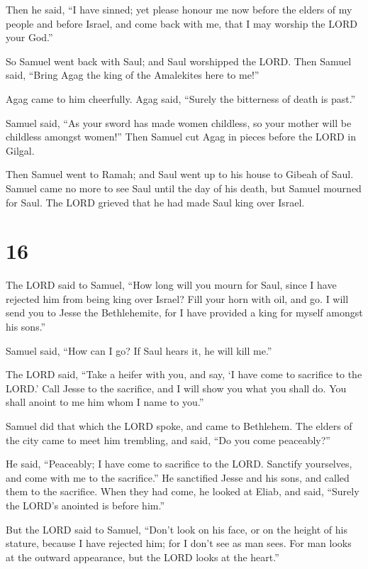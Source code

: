  Then he said, ``I have sinned; yet please honour me now
before the elders of my people and before Israel, and come back with me,
that I may worship the LORD your God.''

 So Samuel went back with Saul; and Saul worshipped the
LORD.  Then Samuel said, ``Bring Agag the king of the
Amalekites here to me!''

Agag came to him cheerfully. Agag said, ``Surely the bitterness of death
is past.''

 Samuel said, ``As your sword has made women childless, so
your mother will be childless amongst women!'' Then Samuel cut Agag in
pieces before the LORD in Gilgal.

 Then Samuel went to Ramah; and Saul went up to his house
to Gibeah of Saul.  Samuel came no more to see Saul until
the day of his death, but Samuel mourned for Saul. The LORD grieved that
he had made Saul king over Israel.

\hypertarget{section-15}{%
\section{16}\label{section-15}}

 The LORD said to Samuel, ``How long will you mourn for
Saul, since I have rejected him from being king over Israel? Fill your
horn with oil, and go. I will send you to Jesse the Bethlehemite, for I
have provided a king for myself amongst his sons.''

 Samuel said, ``How can I go? If Saul hears it, he will kill
me.''

The LORD said, ``Take a heifer with you, and say, `I have come to
sacrifice to the LORD.'  Call Jesse to the sacrifice, and I
will show you what you shall do. You shall anoint to me him whom I name
to you.''

 Samuel did that which the LORD spoke, and came to
Bethlehem. The elders of the city came to meet him trembling, and said,
``Do you come peaceably?''

 He said, ``Peaceably; I have come to sacrifice to the LORD.
Sanctify yourselves, and come with me to the sacrifice.'' He sanctified
Jesse and his sons, and called them to the sacrifice.  When
they had come, he looked at Eliab, and said, ``Surely the LORD's
anointed is before him.''

 But the LORD said to Samuel, ``Don't look on his face, or
on the height of his stature, because I have rejected him; for I don't
see as man sees. For man looks at the outward appearance, but the LORD
looks at the heart.''

